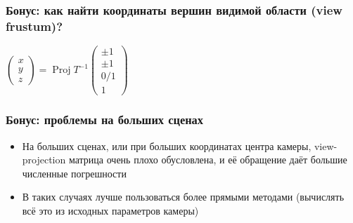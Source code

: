 \documentclass[10pt]{beamer}
\begin{document}
\begin{frame}[fragile]
\frametitle{Бонус: как найти координаты вершин видимой области (view frustum)?}
\begin{center}
\begin{math}
\begin{pmatrix}x \\ y \\ z\end{pmatrix} =
\operatorname{Proj} T^{-1} \begin{pmatrix}\pm 1 \\ \pm 1 \\ 0/1 \\ 1\end{pmatrix}
\end{math}
\end{center}
\end{frame}

\begin{frame}[fragile]
\frametitle{Бонус: проблемы на больших сценах}
\begin{itemize}
\item На больших сценах, или при больших координатах центра камеры, view-projection матрица очень плохо обусловлена, и её обращение даёт большие численные погрешности
\pause
\item В таких случаях лучше пользоваться более прямыми методами (вычислять всё это из исходных параметров камеры)
\end{itemize}
\end{frame}
\end{document}
